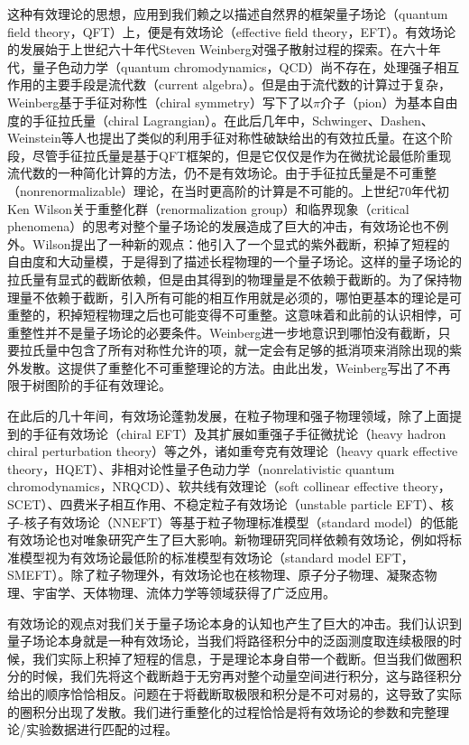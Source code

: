 这种有效理论的思想，应用到我们赖之以描述自然界的框架量子场论（quantum field theory，QFT）上，便是有效场论（effective field theory，EFT）。有效场论的发展始于上世纪六十年代Steven Weinberg对强子散射过程的探索\cite{Weinberg2009,Georgi1993}。在六十年代，量子色动力学（quantum chromodynamics，QCD）尚不存在，处理强子相互作用的主要手段是流代数（current algebra）。但是由于流代数的计算过于复杂，Weinberg基于手征对称性（chiral symmetry）写下了以$\pi$介子（pion）为基本自由度的手征拉氏量（chiral Lagrangian）\cite{Weinberg1967,Weinberg1968}。在此后几年中，Schwinger、Dashen、Weinstein等人也提出了类似的利用手征对称性破缺给出的有效拉氏量。在这个阶段，尽管手征拉氏量是基于QFT框架的，但是它仅仅是作为在微扰论最低阶重现流代数的一种简化计算的方法，仍不是有效场论。由于手征拉氏量是不可重整（nonrenormalizable）理论，在当时更高阶的计算是不可能的。上世纪70年代初Ken Wilson关于重整化群（renormalization group）和临界现象（critical phenomena）的思考\cite{Wilson1971a,Wilson1971b,Wilson1972,Wilson1975}对整个量子场论的发展造成了巨大的冲击，有效场论也不例外。Wilson提出了一种新的观点：他引入了一个显式的紫外截断，积掉了短程的自由度和大动量模，于是得到了描述长程物理的一个量子场论。这样的量子场论的拉氏量有显式的截断依赖，但是由其得到的物理量是不依赖于截断的。为了保持物理量不依赖于截断，引入所有可能的相互作用就是必须的，哪怕更基本的理论是可重整的，积掉短程物理之后也可能变得不可重整。这意味着和此前的认识相悖，可重整性并不是量子场论的必要条件。Weinberg进一步地意识到哪怕没有截断，只要拉氏量中包含了所有对称性允许的项，就一定会有足够的抵消项来消除出现的紫外发散。这提供了重整化不可重整理论的方法。由此出发，Weinberg写出了不再限于树图阶的手征有效理论\cite{Weinberg1979}。

在此后的几十年间，有效场论蓬勃发展，在粒子物理和强子物理领域，除了上面提到的手征有效场论（chiral EFT）及其扩展如重强子手征微扰论（heavy hadron chiral perturbation theory）等之外，诸如重夸克有效理论（heavy quark effective theory，HQET）、非相对论性量子色动力学（nonrelativistic quantum chromodynamics，NRQCD）、软共线有效理论（soft collinear effective theory，SCET）、四费米子相互作用、不稳定粒子有效场论（unstable particle EFT）、核子-核子有效场论（NNEFT）等基于粒子物理标准模型（standard model）的低能有效场论也对唯象研究产生了巨大影响。新物理研究同样依赖有效场论，例如将标准模型视为有效场论最低阶的标准模型有效场论（standard model EFT，SMEFT）。除了粒子物理外，有效场论也在核物理、原子分子物理、凝聚态物理、宇宙学、天体物理、流体力学等领域获得了广泛应用。

有效场论的观点对我们关于量子场论本身的认知也产生了巨大的冲击。我们认识到量子场论本身就是一种有效场论，当我们将路径积分中的泛函测度取连续极限的时候，我们实际上积掉了短程的信息，于是理论本身自带一个截断。但当我们做圈积分的时候，我们先将这个截断趋于无穷再对整个动量空间进行积分，这与路径积分给出的顺序恰恰相反。问题在于将截断取极限和积分是不可对易的，这导致了实际的圈积分出现了发散。我们进行重整化的过程恰恰是将有效场论的参数和完整理论/实验数据进行匹配的过程。

